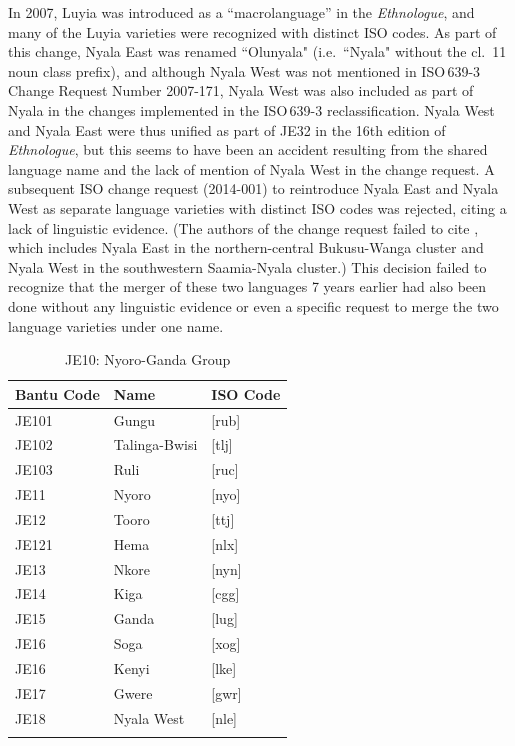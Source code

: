 \documentclass[output=paper]{langscibook}
\begin{document}
In 2007, Luyia was introduced as a “macrolanguage” in the \textit{Ethnologue}, and many of the Luyia varieties were recognized with distinct ISO codes. As part of this change, Nyala East was renamed ``Olunyala" (i.e.\ ``Nyala" without the cl.\ 11 noun class prefix), and although Nyala West was not mentioned in \mbox{ISO\,639-3} Change Request Number 2007-171, Nyala West was also included as part of Nyala in the changes implemented in the ISO\,639-3 reclassification. Nyala West and Nyala East were thus unified as part of JE32 in the 16th edition of \textit{Ethnologue}, but this seems to have been an accident resulting from the shared language name and the lack of mention of Nyala West in the change request. A subsequent ISO change request (2014-001) to reintroduce Nyala East and Nyala West as separate language varieties with distinct ISO codes was rejected, citing a lack of linguistic evidence. (The authors of the change request failed to cite \citet{heine_language_1980}, which includes Nyala East in the northern-central Bukusu-Wanga cluster and Nyala West in the southwestern Saamia-Nyala cluster.) This decision failed to recognize that the merger of these two languages 7 years earlier had also been done without any linguistic evidence or even a specific request to merge the two language varieties under one name.

\begin{table}
\caption{JE10: Nyoro-Ganda Group \citep{maho_nugl_2009}}
\label{tab:3:JE10}
 \begin{tabular}{lll} 
  \lsptoprule
  Bantu Code & Name & ISO Code \\ 
  \midrule
  JE101  & Gungu  & [rub] \\
  JE102  & Talinga-Bwisi  & [tlj] \\
  JE103  & Ruli  & [ruc] \\
  JE11  & Nyoro  & [nyo] \\
  JE12  & Tooro  & [ttj] \\
  JE121  & Hema  & [nlx] \\
  JE13  & Nkore  & [nyn] \\
  JE14  & Kiga  & [cgg] \\
  JE15  & Ganda  & [lug] \\
  JE16  & Soga  & [xog] \\
  JE16  & Kenyi  & [lke] \\
  JE17  & Gwere  & [gwr] \\
  JE18  & Nyala West  & [nle] \\
  \lspbottomrule
 \end{tabular}
\end{table}
\end{document}
